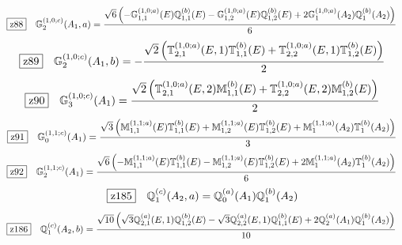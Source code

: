 \documentclass[fleqn,10pt,landscape]{jsarticle}
\begin{document}
\begin{dmath*}
\hspace*{3mm}\fbox{z88}\quad \mathbb{G}_{2}^{(1,0;c)}(A_{1},a)=\frac{\sqrt{6} \left(- \mathbb{G}_{1,1}^{(1,0;a)}(E) \mathbb{Q}_{1,1}^{(b)}(E) - \mathbb{G}_{1,2}^{(1,0;a)}(E) \mathbb{Q}_{1,2}^{(b)}(E) + 2 \mathbb{G}_{1}^{(1,0;a)}(A_{2}) \mathbb{Q}_{1}^{(b)}(A_{2})\right)}{6}
\end{dmath*}
\begin{dmath*}
\hspace*{3mm}\fbox{z89}\quad \mathbb{G}_{2}^{(1,0;c)}(A_{1},b)=- \frac{\sqrt{2} \left(\mathbb{T}_{2,1}^{(1,0;a)}(E,1) \mathbb{T}_{1,1}^{(b)}(E) + \mathbb{T}_{2,2}^{(1,0;a)}(E,1) \mathbb{T}_{1,2}^{(b)}(E)\right)}{2}
\end{dmath*}
\begin{dmath*}
\hspace*{3mm}\fbox{z90}\quad \mathbb{G}_{3}^{(1,0;c)}(A_{1})=\frac{\sqrt{2} \left(\mathbb{T}_{2,1}^{(1,0;a)}(E,2) \mathbb{M}_{1,1}^{(b)}(E) + \mathbb{T}_{2,2}^{(1,0;a)}(E,2) \mathbb{M}_{1,2}^{(b)}(E)\right)}{2}
\end{dmath*}
\begin{dmath*}
\hspace*{3mm}\fbox{z91}\quad \mathbb{G}_{0}^{(1,1;c)}(A_{1})=\frac{\sqrt{3} \left(\mathbb{M}_{1,1}^{(1,1;a)}(E) \mathbb{T}_{1,1}^{(b)}(E) + \mathbb{M}_{1,2}^{(1,1;a)}(E) \mathbb{T}_{1,2}^{(b)}(E) + \mathbb{M}_{1}^{(1,1;a)}(A_{2}) \mathbb{T}_{1}^{(b)}(A_{2})\right)}{3}
\end{dmath*}
\begin{dmath*}
\hspace*{3mm}\fbox{z92}\quad \mathbb{G}_{2}^{(1,1;c)}(A_{1})=\frac{\sqrt{6} \left(- \mathbb{M}_{1,1}^{(1,1;a)}(E) \mathbb{T}_{1,1}^{(b)}(E) - \mathbb{M}_{1,2}^{(1,1;a)}(E) \mathbb{T}_{1,2}^{(b)}(E) + 2 \mathbb{M}_{1}^{(1,1;a)}(A_{2}) \mathbb{T}_{1}^{(b)}(A_{2})\right)}{6}
\end{dmath*}
\begin{dmath*}
\hspace*{3mm}\fbox{z185}\quad \mathbb{Q}_{1}^{(c)}(A_{2},a)=\mathbb{Q}_{0}^{(a)}(A_{1}) \mathbb{Q}_{1}^{(b)}(A_{2})
\end{dmath*}
\begin{dmath*}
\hspace*{3mm}\fbox{z186}\quad \mathbb{Q}_{1}^{(c)}(A_{2},b)=\frac{\sqrt{10} \left(\sqrt{3} \mathbb{Q}_{2,1}^{(a)}(E,1) \mathbb{Q}_{1,2}^{(b)}(E) - \sqrt{3} \mathbb{Q}_{2,2}^{(a)}(E,1) \mathbb{Q}_{1,1}^{(b)}(E) + 2 \mathbb{Q}_{2}^{(a)}(A_{1}) \mathbb{Q}_{1}^{(b)}(A_{2})\right)}{10}
\end{dmath*}
\end{document}
